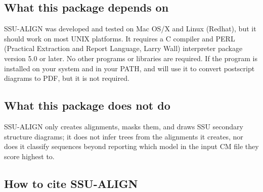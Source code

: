 \subsection{What this package depends on}
SSU-ALIGN was developed and tested on Mac OS/X and Linux
(Redhat), but it should work on most UNIX platforms. It requires a C
compiler and PERL (Practical Extraction and Report
Language, Larry Wall) interpreter package version 5.0 or later.  No
other programs or libraries are required. If the program 
is installed on your system and in your PATH,  and
 will use it to convert postscript diagrams to PDF, but
it is not required.

\subsection{What this package does not do}

SSU-ALIGN only creates alignments, masks them, and draws SSU
secondary structure diagrams; it does not infer trees from the
alignments it creates, nor does it classify sequences beyond reporting
which model in the input CM file they score highest to.

\subsection{How to cite SSU-ALIGN}

